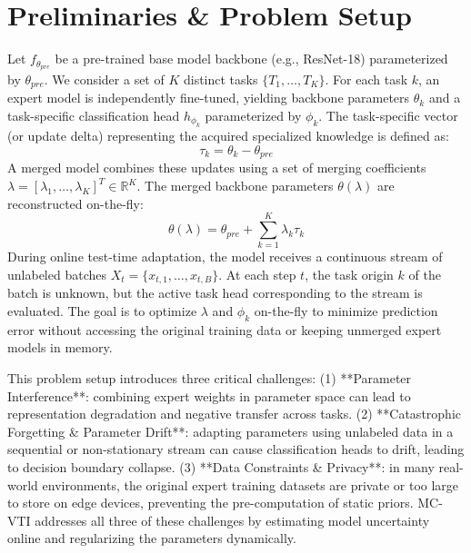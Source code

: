\documentclass{article}
\theoremstyle{plain}
\theoremstyle{definition}
\theoremstyle{remark}
\begin{document}
\section{Preliminaries \& Problem Setup}
\label{sec:prelims}
Let $f_{\theta_{pre}}$ be a pre-trained base model backbone (e.g., ResNet-18) parameterized by $\theta_{pre}$. We consider a set of $K$ distinct tasks $\{T_1, \dots, T_K\}$. For each task $k$, an expert model is independently fine-tuned, yielding backbone parameters $\theta_k$ and a task-specific classification head $h_{\phi_k}$ parameterized by $\phi_k$. The task-specific vector (or update delta) representing the acquired specialized knowledge is defined as:
\begin{equation}
  \tau_k = \theta_k - \theta_{pre}
\end{equation}
A merged model combines these updates using a set of merging coefficients $\lambda = [\lambda_1, \dots, \lambda_K]^T \in \mathbb{R}^K$. The merged backbone parameters $\theta(\lambda)$ are reconstructed on-the-fly:
\begin{equation}
  \theta(\lambda) = \theta_{pre} + \sum_{k=1}^K \lambda_k \tau_k
\end{equation}
During online test-time adaptation, the model receives a continuous stream of unlabeled batches $X_t = \{x_{t,1}, \dots, x_{t,B}\}$. At each step $t$, the task origin $k$ of the batch is unknown, but the active task head corresponding to the stream is evaluated. The goal is to optimize $\lambda$ and $\phi_k$ on-the-fly to minimize prediction error without accessing the original training data or keeping unmerged expert models in memory.

This problem setup introduces three critical challenges: (1) **Parameter Interference**: combining expert weights in parameter space can lead to representation degradation and negative transfer across tasks. (2) **Catastrophic Forgetting \& Parameter Drift**: adapting parameters using unlabeled data in a sequential or non-stationary stream can cause classification heads to drift, leading to decision boundary collapse. (3) **Data Constraints \& Privacy**: in many real-world environments, the original expert training datasets are private or too large to store on edge devices, preventing the pre-computation of static priors. MC-VTI addresses all three of these challenges by estimating model uncertainty online and regularizing the parameters dynamically.
\end{document}
